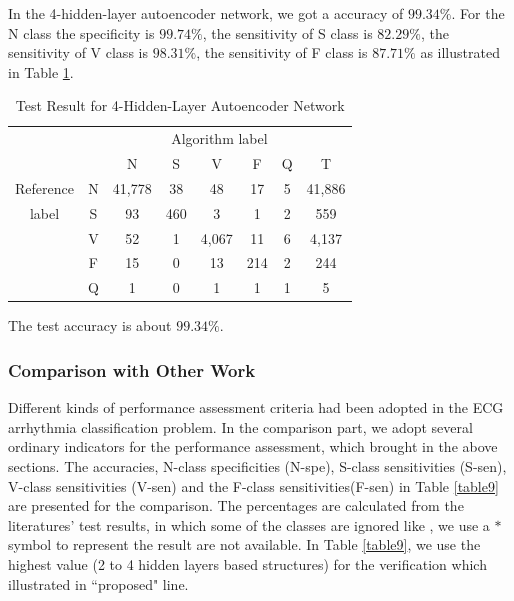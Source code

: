 \documentclass{bmcart}
\begin{document}
In the 4-hidden-layer autoencoder network, we got a accuracy of $99.34\%$. For the N class the specificity is $99.74\%$, the sensitivity of S class is $82.29\%$, the sensitivity of V class is $98.31\%$, the sensitivity of F class is $87.71\%$ as illustrated in Table \ref{table7}. 


\begin{table}[!htbp]
\begin{center}
\begin{threeparttable}
\caption{Test Result for 4-Hidden-Layer Autoencoder Network}
\label{table7}
\begin{tabular}{cccccccc}
\hline
\multicolumn{6}{r}{Algorithm label} \\
\cline{3-7}
		&  & N & S      & V    & F     & Q   & T\\
\hline
 Reference & N & 41,778 &  38  &  48   & 17  & 5  &  41,886 \\
	label  & S &  93    & 460  &   3   & 1   & 2  &  559\\
		   & V &  52    & 1    & 4,067 & 11  & 6  &  4,137\\
		   & F &  15    & 0    & 13    & 214 & 2  &  244\\
		   & Q &  1     & 0    & 1     & 1   & 1  &  5\\
\hline
\end{tabular}
\begin{tablenotes}
\item The test accuracy is about $99.34\%$.
\end{tablenotes}
\end{threeparttable}
\end{center}
\end{table}


\subsubsection*{Comparison with Other Work}
Different kinds of performance assessment criteria had been adopted in the ECG arrhythmia classification problem. In the comparison part, we adopt several ordinary indicators for the performance assessment, which brought in the above sections. The accuracies, N-class specificities (N-spe), S-class sensitivities (S-sen), V-class sensitivities (V-sen) and the F-class sensitivities(F-sen) in Table \ref{table9} are presented for the comparison. The percentages are calculated from the literatures' test results, in which some of the classes are ignored like \cite{melgan}, we use a $*$ symbol to represent the result are not available. 
In Table \ref{table9}, we use the highest value (2 to 4 hidden layers based structures) for the verification which illustrated in ``proposed" line.
\end{document}
